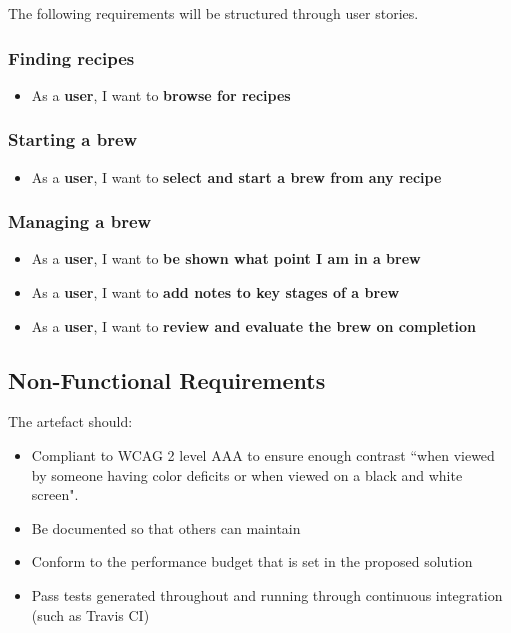 The following requirements will be structured through user stories. %

\subsubsection{Finding recipes}

\begin{itemize}
  \item As a \textbf{user}, I want to \textbf{browse for recipes}
\end{itemize}

\subsubsection{Starting a brew}

\begin{itemize}
  \item As a \textbf{user}, I want to \textbf{select and start a brew from any recipe}
\end{itemize}

\subsubsection{Managing a brew}

\begin{itemize}
  \item As a \textbf{user}, I want to \textbf{be shown what point I am in a brew}
  \item As a \textbf{user}, I want to \textbf{add notes to key stages of a brew}
  \item As a \textbf{user}, I want to \textbf{review and evaluate the brew on completion}
\end{itemize}

\subsection{Non-Functional Requirements} \label{a-d--requirements--non-functional}

The artefact should:

\begin{itemize}
  \item Compliant to WCAG 2 level AAA to ensure enough contrast ``when viewed by someone having color deficits or when viewed on a black and white screen". \cite{colour_contrast}
  \item Be documented so that others can maintain
  \item Conform to the performance budget that is set in the proposed solution
  \item Pass tests generated throughout and running through continuous integration (such as Travis CI)
\end{itemize}

